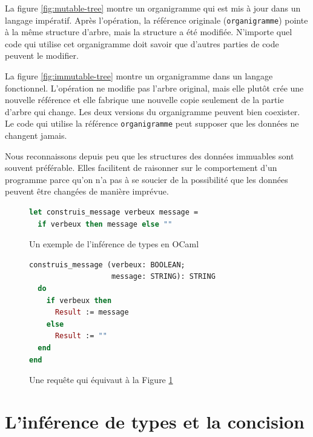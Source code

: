 \documentclass[french]{report}
\begin{document}
La figure \ref{fig:mutable-tree} montre un organigramme qui est mis à jour dans un langage impératif. Après l'opération, la référence originale (\texttt{organigramme}) pointe à la même structure d'arbre, mais la structure a été modifiée. N'importe quel code qui utilise cet organigramme doit savoir que d'autres parties de code peuvent le modifier.

La figure \ref{fig:immutable-tree} montre un organigramme dans un langage fonctionnel. L'opération ne modifie pas l'arbre original, mais elle plutôt crée une nouvelle référence et elle fabrique une nouvelle copie seulement de la partie d'arbre qui change. Les deux versions du organigramme peuvent bien coexister. Le code qui utilise la référence \texttt{organigramme} peut supposer que les données ne changent jamais.

Nous reconnaissons depuis peu que les structures des données immuables sont souvent préférable. Elles facilitent de raisonner sur le comportement d'un programme parce qu'on n'a pas à se soucier de la possibilité que les données peuvent être changées de manière imprévue.

\begin{figure}[h]
	\begin{lstlisting}[language=Caml]
let construis_message verbeux message = 
  if verbeux then message else ""
	\end{lstlisting}
	
	\caption{Un exemple de l'inférence de types en OCaml\protect\footnotemark}
	\label{fig:type-inference-code}
\end{figure}


\begin{figure}[h]
	\begin{lstlisting}[language=Eiffel]
construis_message (verbeux: BOOLEAN; 
                   message: STRING): STRING
  do
    if verbeux then
      Result := message
    else
      Result := ""
  end
end
	\end{lstlisting}
	\caption{Une requête qui équivaut à la Figure \ref{fig:type-inference-code}}
	\label{fig:without-type-inference-code}
\end{figure}

\section{L'inférence de types et la concision}
\end{document}
